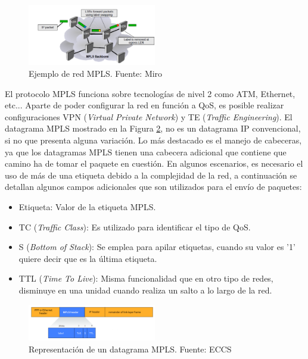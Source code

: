 		   \begin{figure}[H]
			\centering
			\includegraphics[width=0.5\textwidth]{img/mpls.PNG}
			\caption{Ejemplo de red MPLS. Fuente: Miro}
			\label{mpls}
		\end{figure}
		 El protocolo MPLS funciona sobre tecnologías de nivel 2 como ATM, Ethernet, etc... Aparte de poder configurar la red en función a QoS, es posible realizar configuraciones VPN (\textit{Virtual Private Network}) y TE (\textit{Traffic Engineering}). El datagrama MPLS mostrado en la Figura \ref{mplsData}, no es un datagrama IP convencional, si no que presenta alguna variación. Lo más destacado es el manejo de cabeceras, ya que los datagramas MPLS tienen una cabecera adicional que contiene que camino ha de tomar el paquete en cuestión. En algunos escenarios, es necesario el uso de más de una etiqueta debido a la complejidad de la red, a continuación se detallan algunos campos adicionales que son utilizados para el envío de paquetes:
		 \begin{itemize}
		    \item Etiqueta: Valor de la etiqueta MPLS.
		     \item TC (\textit{Traffic Class}): Es utilizado para identificar el tipo de QoS.
		     \item S (\textit{Bottom of Stack}): Se emplea para apilar etiquetas, cuando su valor es '1' quiere decir que es la última etiqueta.
		     \item TTL (\textit{Time To Live}): Misma funcionalidad que en otro tipo de redes, disminuye en una unidad cuando realiza un salto a lo largo de la red.
		 \end{itemize}
		 
		   \begin{figure}[H]
			\centering
			\includegraphics[width=0.5\textwidth]{img/datagramaMPLS.PNG}
			\caption{Representación de un datagrama MPLS. Fuente: ECCS}
			\label{mplsData}
		\end{figure}
		
